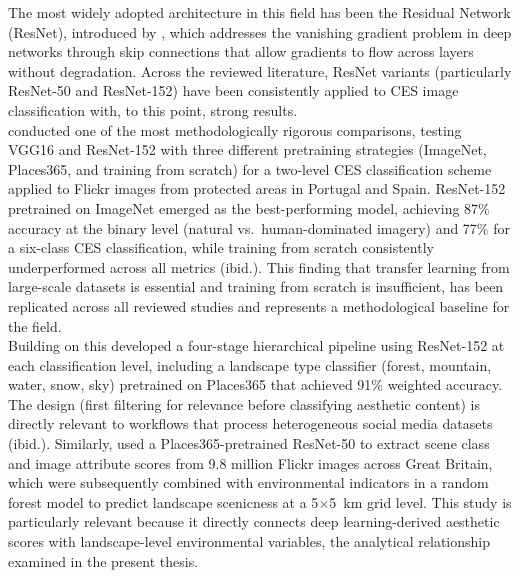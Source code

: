 \documentclass[hidelinks, 11pt]{article}
\begin{document}
The most widely adopted architecture in this field has been the Residual Network (ResNet), introduced by \citet{he_deep_2016}, which addresses the vanishing gradient problem in deep networks through skip connections that allow gradients to flow across layers without degradation. Across the reviewed literature, ResNet variants (particularly ResNet-50 and ResNet-152) have been consistently applied to CES image classification with, to this point, strong results.
\\
\citet{cardoso_classifying_2022} conducted one of the most methodologically rigorous comparisons, testing VGG16 and ResNet-152 with three different pretraining strategies (ImageNet, Places365, and training from scratch) for a two-level CES classification scheme applied to Flickr images from protected areas in Portugal and Spain. ResNet-152 pretrained on ImageNet emerged as the best-performing model, achieving 87\% accuracy at the binary level (natural vs.\ human-dominated imagery) and 77\% for a six-class CES classification, while training from scratch consistently underperformed across all metrics (ibid.). This finding that transfer learning from large-scale datasets is essential and training from scratch is insufficient, has been replicated across all reviewed studies and represents a methodological baseline for the field.
\\
Building on this \citet{lingua_valuing_2022} developed a four-stage hierarchical pipeline using ResNet-152 at each classification level, including a landscape type classifier (forest, mountain, water, snow, sky) pretrained on Places365 that achieved 91\% weighted accuracy. The design (first filtering for relevance before classifying aesthetic content) is directly relevant to workflows that process heterogeneous social media datasets (ibid.). Similarly, \citet{havinga_social_2021} used a Places365-pretrained ResNet-50 to extract scene class and image attribute scores from 9.8 million Flickr images across Great Britain, which were subsequently combined with environmental indicators in a random forest model to predict landscape scenicness at a 5$\times$5~km grid level. This study is particularly relevant because it directly connects deep learning-derived aesthetic scores with landscape-level environmental variables, the analytical relationship examined in the present thesis.
\\
\end{document}
